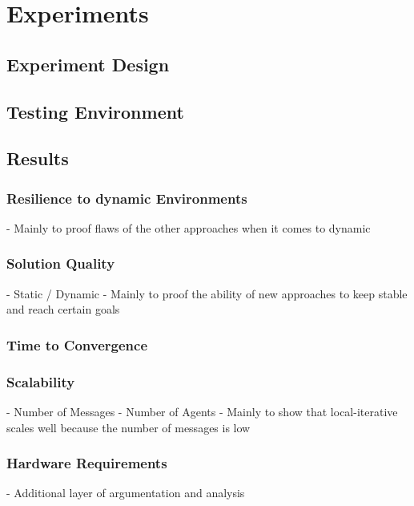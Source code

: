 \chapter{Experiments}
\section{Experiment Design}
\section{Testing Environment}
\section{Results}
\subsection{Resilience to dynamic Environments}
- Mainly to proof flaws of the other approaches when it comes to dynamic
\subsection{Solution Quality}
- Static / Dynamic
- Mainly to proof the ability of new approaches to keep stable and reach certain goals
\subsection{Time to Convergence}

\subsection{Scalability}
-  Number of Messages
- Number of Agents
- Mainly to show that local-iterative scales well because the number of messages is low
\subsection{Hardware Requirements}
- Additional layer of argumentation and analysis